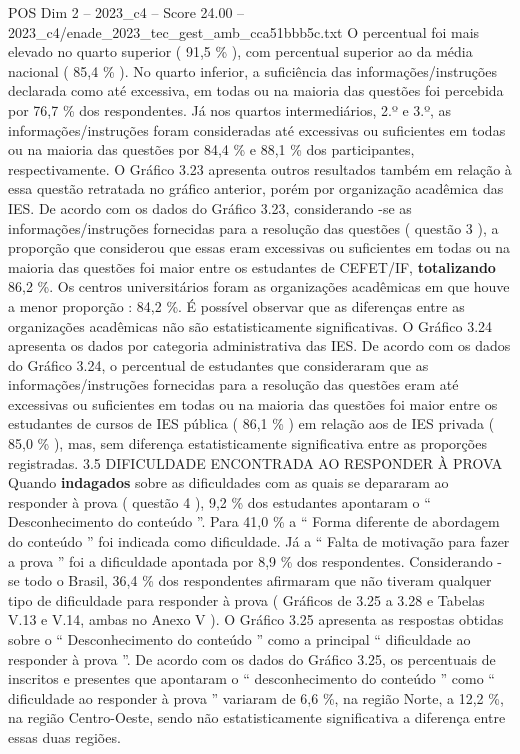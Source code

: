 \begin{textsample}{POS Dim 2 – 2023\_c4 – Score 24.00 – 2023\_c4/enade\_2023\_tec\_gest\_amb\_cca51bbb5c.txt}
O percentual foi mais elevado no quarto superior ( 91,5 \% ), com percentual superior ao da média nacional ( 85,4 \% ).
No quarto inferior, a suficiência das informações/instruções declarada como até excessiva, em todas ou na maioria das questões foi percebida por 76,7 \% dos respondentes.
Já nos quartos intermediários, 2.º e 3.º, as informações/instruções foram consideradas até excessivas ou suficientes em todas ou na maioria das questões por 84,4 \% e 88,1 \% dos participantes, respectivamente.
O Gráfico 3.23 apresenta outros resultados também em relação à essa questão retratada no gráfico anterior, porém por organização acadêmica das IES.
De acordo com os dados do Gráfico 3.23, considerando -se as informações/instruções fornecidas para a resolução das questões ( questão 3 ), a proporção que considerou que essas eram excessivas ou suficientes em todas ou na maioria das questões foi maior entre os estudantes de CEFET/IF, \textbf{totalizando} 86,2 \%.
Os centros universitários foram as organizações acadêmicas em que houve a menor proporção : 84,2 \%.
É possível observar que as diferenças entre as organizações acadêmicas não são estatisticamente significativas.
O Gráfico 3.24 apresenta os dados por categoria administrativa das IES.
De acordo com os dados do Gráfico 3.24, o percentual de estudantes que consideraram que as informações/instruções fornecidas para a resolução das questões eram até excessivas ou suficientes em todas ou na maioria das questões foi maior entre os estudantes de cursos de IES pública ( 86,1 \% ) em relação aos de IES privada ( 85,0 \% ), mas, sem diferença estatisticamente significativa entre as proporções registradas. 3.5 DIFICULDADE ENCONTRADA AO RESPONDER À PROVA Quando \textbf{indagados} sobre as dificuldades com as quais se depararam ao responder à prova ( questão 4 ), 9,2 \% dos estudantes apontaram o “ Desconhecimento do conteúdo ”.
Para 41,0 \% a “ Forma diferente de abordagem do conteúdo ” foi indicada como dificuldade.
Já a “ Falta de motivação para fazer a prova ” foi a dificuldade apontada por 8,9 \% dos respondentes.
Considerando -se todo o Brasil, 36,4 \% dos respondentes afirmaram que não tiveram qualquer tipo de dificuldade para responder à prova ( Gráficos de 3.25 a 3.28 e Tabelas V.13 e V.14, ambas no Anexo V ).
O Gráfico 3.25 apresenta as respostas obtidas sobre o “ Desconhecimento do conteúdo ” como a principal “ dificuldade ao responder à prova ”.
De acordo com os dados do Gráfico 3.25, os percentuais de inscritos e presentes que apontaram o “ desconhecimento do conteúdo ” como “ dificuldade ao responder à prova ” variaram de 6,6 \%, na região Norte, a 12,2 \%, na região Centro-Oeste, sendo não estatisticamente significativa a diferença entre essas duas regiões.

\end{textsample}
